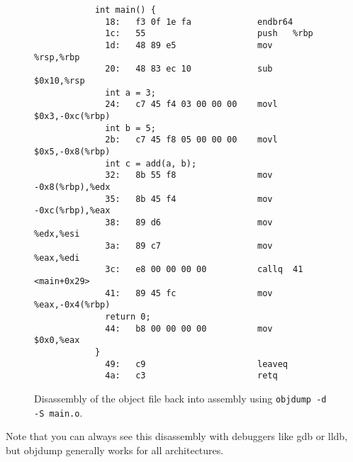\begin{theorem}
\begin{figure}[H]
\begin{lstlisting}
            int main() {
              18:	f3 0f 1e fa          	endbr64 
              1c:	55                   	push   %rbp
              1d:	48 89 e5             	mov    %rsp,%rbp
              20:	48 83 ec 10          	sub    $0x10,%rsp
              int a = 3; 
              24:	c7 45 f4 03 00 00 00 	movl   $0x3,-0xc(%rbp)
              int b = 5; 
              2b:	c7 45 f8 05 00 00 00 	movl   $0x5,-0x8(%rbp)
              int c = add(a, b); 
              32:	8b 55 f8             	mov    -0x8(%rbp),%edx
              35:	8b 45 f4             	mov    -0xc(%rbp),%eax
              38:	89 d6                	mov    %edx,%esi
              3a:	89 c7                	mov    %eax,%edi
              3c:	e8 00 00 00 00       	callq  41 <main+0x29>
              41:	89 45 fc             	mov    %eax,-0x4(%rbp)
              return 0; 
              44:	b8 00 00 00 00       	mov    $0x0,%eax
            }
              49:	c9                   	leaveq 
              4a:	c3                   	retq  
          \end{lstlisting}
          \caption{Disassembly of the object file back into assembly using \texttt{objdump -d -S main.o}.} 
          \label{fig:disassembly_example_intermixed}
        \end{figure}
        Note that you can always see this disassembly with debuggers like gdb or lldb, but objdump generally works for all architectures. 
      \end{theorem}

